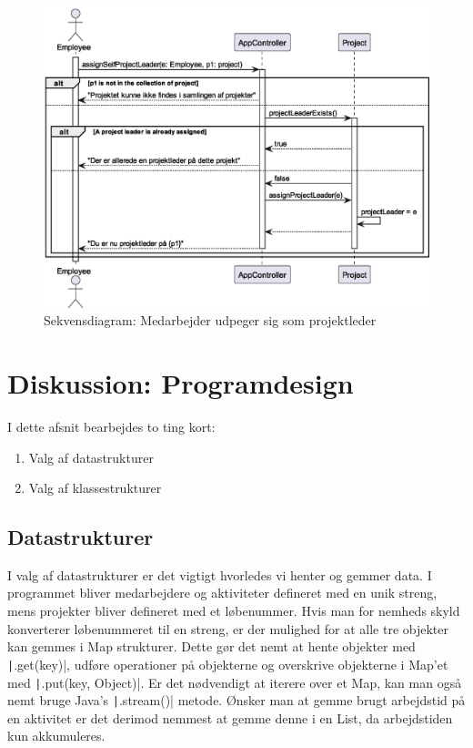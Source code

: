 \begin{figure}[H]
    \centering
    \caption{Sekvensdiagram: Medarbejder udpeger sig som projektleder}\label{fig:becomeProjectLeader}
    \includegraphics[width = 1\textwidth]{Diagrams/BecomeProjectLeader.eps}
\end{figure}
\newpage
\section{Diskussion: Programdesign}
I dette afsnit bearbejdes to ting kort:
\begin{enumerate}
    \item Valg af datastrukturer
    \item Valg af klassestrukturer
\end{enumerate}
\subsection{Datastrukturer} I valg af datastrukturer er det vigtigt hvorledes vi henter og gemmer data. I programmet bliver medarbejdere og aktiviteter defineret med en unik streng, mens projekter bliver defineret med et løbenummer. Hvis man for nemheds skyld konverterer løbenummeret til en streng, er der mulighed for at alle tre objekter kan gemmes i Map strukturer. Dette gør det nemt at hente objekter med \texttt|.get(key)|, udføre operationer på objekterne og overskrive objekterne i Map'et med \texttt|.put(key, Object)|. Er det nødvendigt at iterere over et Map, kan man også nemt bruge Java's \texttt|.stream()| metode. Ønsker man at gemme brugt arbejdstid på en aktivitet er det derimod nemmest at gemme denne i en List, da arbejdstiden kun akkumuleres.
